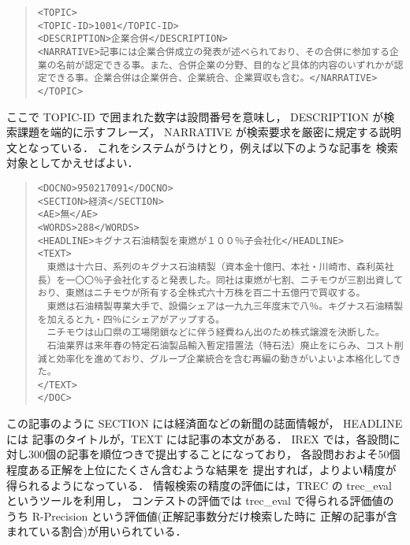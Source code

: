 \vspace{0.1cm}

\begin{quote}
\begin{verbatim}
<TOPIC>
<TOPIC-ID>1001</TOPIC-ID>
<DESCRIPTION>企業合併</DESCRIPTION>
<NARRATIVE>記事には企業合併成立の発表が述べられており、その合併に参加する企業の名前が認定できる事。また、合併企業の分野、目的など具体的内容のいずれかが認定できる事。企業合併は企業併合、企業統合、企業買収も含む。</NARRATIVE>
</TOPIC>
\end{verbatim}
\end{quote}

\vspace{0.1cm}

ここで TOPIC-ID で囲まれた数字は設問番号を意味し，
DESCRIPTION が検索課題を端的に示すフレーズ，
NARRATIVE が検索要求を厳密に規定する説明文となっている．
これをシステムがうけとり，例えば以下のような記事を
検索対象としてかえせばよい．

\vspace{0.1cm}

\begin{quote}
\begin{verbatim}
<DOCNO>950217091</DOCNO>
<SECTION>経済</SECTION>
<AE>無</AE>
<WORDS>288</WORDS>
<HEADLINE>キグナス石油精製を東燃が１００％子会社化</HEADLINE>
<TEXT>
　東燃は十六日、系列のキグナス石油精製（資本金十億円、本社・川崎市、森利英社長）を一〇〇％子会社化すると発表した。同社は東燃が七割、ニチモウが三割出資しており、東燃はニチモウが所有する全株式六十万株を百二十五億円で買収する。
　東燃は石油精製専業大手で、設備シェアは一九九三年度末で八％。キグナス石油精製を加えると九・四％にシェアがアップする。
　ニチモウは山口県の工場閉鎖などに伴う経費ねん出のため株式譲渡を決断した。
　石油業界は来年春の特定石油製品輸入暫定措置法（特石法）廃止をにらみ、コスト削減と効率化を進めており、グループ企業統合を含む再編の動きがいよいよ本格化してきた。
</TEXT>
</DOC>
\end{verbatim}
\end{quote}

\vspace{0.1cm}

この記事のように SECTION には経済面などの新聞の誌面情報が， HEADLINE には
記事のタイトルが，TEXT には記事の本文がある．
IREX では，各設問に対し300個の記事を順位つきで提出することになっており，
各設問おおよそ50個程度ある正解を上位にたくさん含むような結果を
提出すれば，よりよい精度が得られるようになっている．
情報検索の精度の評価には，TREC の trec\_eval というツール\cite{trec_eval}を利用し，
コンテストの評価では trec\_eval で得られる評価値のうち  
R-Precision という評価値(正解記事数分だけ検索した時に
正解の記事が含まれている割合)が用いられている．

